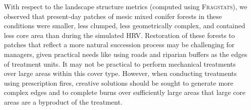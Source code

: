 With respect to the landscape structure metrics (computed using \textsc{Fragstats}), we observed that present-day patches of mesic mixed conifer forests in these conditions were smaller, less clumped, less geometrically complex, and contained less core area than during the simulated HRV. Restoration of these forests to patches that reflect a more natural succession process may be challenging for managers, given practical needs like using roads and riparian buffers as the edges of treatment units. It may not be practical to perform mechanical treatments over large areas within this cover type. However, when conducting treatments using prescription fires, creative solutions should be sought to generate more complex edges and to complete burns over sufficiently large areas that large core areas are a byproduct of the treatment.
       











